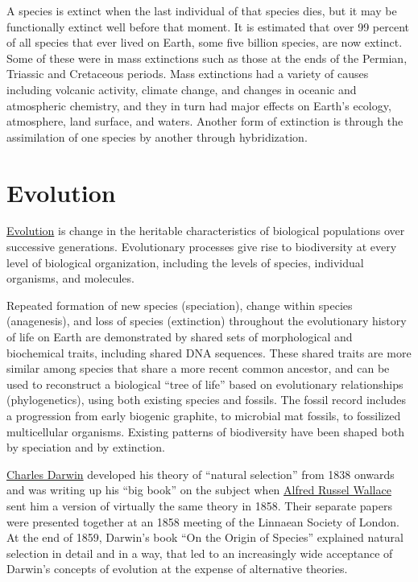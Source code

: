 A species is extinct when the last individual of that species dies, but
it may be functionally extinct well before that moment. It is estimated
that over 99 percent of all species that ever lived on Earth, some five
billion species, are now extinct. Some of these were in mass extinctions
such as those at the ends of the Permian, Triassic and Cretaceous
periods. Mass extinctions had a variety of causes including volcanic
activity, climate change, and changes in oceanic and atmospheric
chemistry, and they in turn had major effects on Earth's ecology,
atmosphere, land surface, and waters. Another form of extinction is
through the assimilation of one species by another through
hybridization. 

\section{Evolution}\label{evolution}

\href{https://en.wikipedia.org/wiki/Evolution}{Evolution} is change in
the heritable characteristics of biological populations over successive
generations. Evolutionary processes give rise to biodiversity at every
level of biological organization, including the levels of species,
individual organisms, and molecules.

Repeated formation of new species (speciation), change within species
(anagenesis), and loss of species (extinction) throughout the
evolutionary history of life on Earth are demonstrated by shared sets of
morphological and biochemical traits, including shared DNA sequences.
These shared traits are more similar among species that share a more
recent common ancestor, and can be used to reconstruct a biological
``tree of life'' based on evolutionary relationships (phylogenetics),
using both existing species and fossils. The fossil record includes a
progression from early biogenic graphite, to microbial mat fossils, to
fossilized multicellular organisms. Existing patterns of biodiversity
have been shaped both by speciation and by extinction.

\href{https://en.wikipedia.org/wiki/Charles_Darwin}{Charles Darwin}
developed his theory of ``natural selection'' from 1838 onwards and was
writing up his ``big book'' on the subject when
\href{https://en.wikipedia.org/wiki/Alfred_Russel_Wallace}{Alfred Russel
Wallace} sent him a version of virtually the same theory in 1858. Their
separate papers were presented together at an 1858 meeting of the
Linnaean Society of London. At the end of 1859, Darwin's book ``On the
Origin of Species'' explained natural selection in detail and in a way,
that led to an increasingly wide acceptance of Darwin's concepts of
evolution at the expense of alternative theories.

